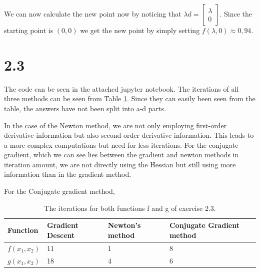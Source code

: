\documentclass{article}
\begin{document}
	We can now calculate the new point now by noticing that $\lambda d = \begin{bmatrix} \lambda \\ 0 \end{bmatrix}$. Since the starting point is $(0,0)$ we get the new point by simply setting $f(\lambda,0) \approx 0,94$.
	
\section*{2.3}
\begin{table}[H]
	The code can be seen in the attached jupyter notebook.
	The iterations of all three methods can be seen from Table \ref{tab:iterations}. Since they can easily been seen from the table, the answers have not been split into a-d parts.
	
	In the case of the Newton method, we are not only employing first-order derivative information but also second order derivative information. This leads to a more complex computations but need for less iterations. For the conjugate gradient, which we can see lies between the gradient and newton methods in iteration amount, we are not directly using the Hessian but still using more information than in the gradient method.
	
	For the Conjugate gradient method, 
	\centering
	\caption{The iterations for both functions f and g of exercise 2.3.}
	\label{tab:iterations}
	\begin{tabular}{|l|l|l|l|}
		\hline
		Function   & Gradient Descent & Newton’s method & Conjugate Gradient method \\ \hline
		$f(x_1,x_2)$ & 11               & 1               & 8                       \\ \hline
		$g(x_1,x_2)$ & 18               & 4               & 6                       \\ \hline
	\end{tabular}
\end{table}
\end{document}

